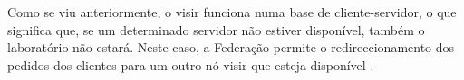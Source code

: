 Como se viu anteriormente, o \acrshort{visir} funciona numa base de cliente-servidor, o que significa que, se um determinado servidor não estiver disponível, também o laboratório não estará. Neste caso, a Federação permite o redireccionamento dos pedidos dos clientes para um outro nó \acrshort{visir} que esteja disponível \cite{kreiter}.
